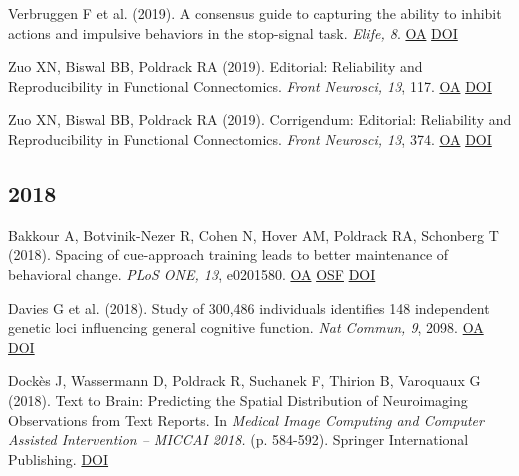 Verbruggen F et al. (2019). A consensus guide to capturing the ability to inhibit actions and impulsive behaviors in the stop-signal task. \textit{Elife, 8}. \href{https://www.ncbi.nlm.nih.gov/pmc/articles/PMC6533084}{OA} \href{http://dx.doi.org/10.7554/elife.46323}{DOI} \vspace{2mm}

Zuo XN, Biswal BB, Poldrack RA (2019). Editorial: Reliability and Reproducibility in Functional Connectomics. \textit{Front Neurosci, 13}, 117. \href{https://www.ncbi.nlm.nih.gov/pmc/articles/PMC6391345}{OA} \href{http://dx.doi.org/10.3389/fnins.2019.00117}{DOI} \vspace{2mm}

Zuo XN, Biswal BB, Poldrack RA (2019). Corrigendum: Editorial: Reliability and Reproducibility in Functional Connectomics. \textit{Front Neurosci, 13}, 374. \href{https://www.ncbi.nlm.nih.gov/pmc/articles/PMC6477511}{OA} \href{http://dx.doi.org/10.3389/fnins.2019.00374}{DOI} \vspace{2mm}

\subsection*{2018}

Bakkour A, Botvinik-Nezer R, Cohen N, Hover AM, Poldrack RA, Schonberg T (2018). Spacing of cue-approach training leads to better maintenance of behavioral change. \textit{PLoS ONE, 13}, e0201580. \href{https://www.ncbi.nlm.nih.gov/pmc/articles/PMC6066248}{OA} \href{https://osf.io/fdvrk/}{OSF} \href{http://dx.doi.org/10.1371/journal.pone.0201580}{DOI} \vspace{2mm}

Davies G et al. (2018). Study of 300,486 individuals identifies 148 independent genetic loci influencing general cognitive function. \textit{Nat Commun, 9}, 2098. \href{https://www.ncbi.nlm.nih.gov/pmc/articles/PMC5974083}{OA} \href{http://dx.doi.org/10.1038/s41467-018-04362-x}{DOI} \vspace{2mm}

Dockès J, Wassermann D, Poldrack R, Suchanek F, Thirion B, Varoquaux G (2018). Text to Brain: Predicting the Spatial Distribution of Neuroimaging Observations from Text Reports. In \textit{Medical Image Computing and Computer Assisted Intervention – MICCAI 2018.} (p. 584-592). Springer International Publishing. \href{http://dx.doi.org/10.1007/978-3-030-00931-1\_67}{DOI} \vspace{2mm}

